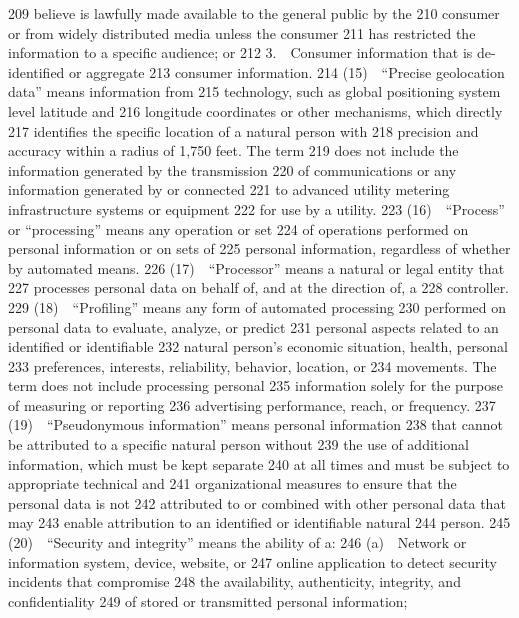   209  believe is lawfully made available to the general public by the
  210  consumer or from widely distributed media unless the consumer
  211  has restricted the information to a specific audience; or
  212         3. Consumer information that is de-identified or aggregate
  213  consumer information.
  214         (15) “Precise geolocation data” means information from
  215  technology, such as global positioning system level latitude and
  216  longitude coordinates or other mechanisms, which directly
  217  identifies the specific location of a natural person with
  218  precision and accuracy within a radius of 1,750 feet. The term
  219  does not include the information generated by the transmission
  220  of communications or any information generated by or connected
  221  to advanced utility metering infrastructure systems or equipment
  222  for use by a utility.
  223         (16) “Process” or “processing” means any operation or set
  224  of operations performed on personal information or on sets of
  225  personal information, regardless of whether by automated means.
  226         (17) “Processor” means a natural or legal entity that
  227  processes personal data on behalf of, and at the direction of, a
  228  controller.
  229         (18) “Profiling” means any form of automated processing
  230  performed on personal data to evaluate, analyze, or predict
  231  personal aspects related to an identified or identifiable
  232  natural person’s economic situation, health, personal
  233  preferences, interests, reliability, behavior, location, or
  234  movements. The term does not include processing personal
  235  information solely for the purpose of measuring or reporting
  236  advertising performance, reach, or frequency.
  237         (19) “Pseudonymous information” means personal information
  238  that cannot be attributed to a specific natural person without
  239  the use of additional information, which must be kept separate
  240  at all times and must be subject to appropriate technical and
  241  organizational measures to ensure that the personal data is not
  242  attributed to or combined with other personal data that may
  243  enable attribution to an identified or identifiable natural
  244  person.
  245         (20) “Security and integrity” means the ability of a:
  246         (a) Network or information system, device, website, or
  247  online application to detect security incidents that compromise
  248  the availability, authenticity, integrity, and confidentiality
  249  of stored or transmitted personal information;
